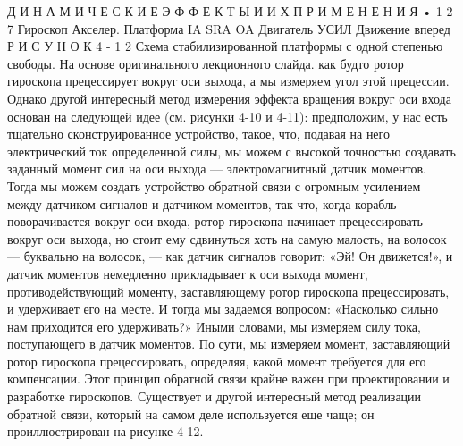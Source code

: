 \documentclass[10pt,oneside]{article}
\begin{document}
Д И Н А М И Ч Е С К И Е  Э Ф Ф Е К Т Ы  И  И Х  П Р И М Е Н Е Н И Я • 1 2 7 Гироскоп Акселер. Платформа IA SRA OA Двигатель УСИЛ Движение вперед Р И С У Н О К  4 - 1 2 Схема стабилизированной платформы с одной степенью свободы. На основе оригинального лекционного слайда. как будто ротор гироскопа прецессирует вокруг оси выхода, а мы измеряем угол этой прецессии. Однако другой интересный метод измерения эффекта вращения вокруг оси входа основан на следующей идее (см. рисунки 4-10 и 4-11): предположим, у нас есть тщательно сконструированное устройство, такое, что, подавая на него электрический ток определенной силы, мы можем с высокой точностью создавать заданный момент сил на оси выхода --- электромагнитный датчик моментов. Тогда мы можем создать устройство обратной связи с огромным усилением между датчиком сигналов и датчиком моментов, так что, когда корабль поворачивается вокруг оси входа, ротор гироскопа начинает прецессировать вокруг оси выхода, но стоит ему сдвинуться хоть на самую малость, на волосок --- буквально на волосок, --- как датчик сигналов говорит: «Эй! Он движется!», и датчик моментов немедленно прикладывает к оси выхода момент, противодействующий моменту, заставляющему ротор гироскопа прецессировать, и удерживает его на месте. И тогда мы задаемся вопросом: «Насколько сильно нам приходится его удерживать?» Иными словами, мы измеряем силу тока, поступающего в датчик моментов. По сути, мы измеряем момент, заставляющий ротор гироскопа прецессировать, определяя, какой момент требуется для его компенсации. Этот принцип обратной связи крайне важен при проектировании и разработке гироскопов. Существует и другой интересный метод реализации обратной связи, который на самом деле используется еще чаще; он проиллюстрирован на рисунке 4-12.\par
\end{document}
